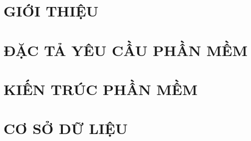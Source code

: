 \documentclass[a4paper,12pt]{report}
\begin{document}


\tableofcontents
\newpage



\newpage

\chapter{GIỚI THIỆU}



\chapter{ĐẶC TẢ YÊU CẦU PHẦN MỀM}


\chapter{KIẾN TRÚC PHẦN MỀM}



\chapter{CƠ SỞ DỮ LIỆU}

\end{document}
